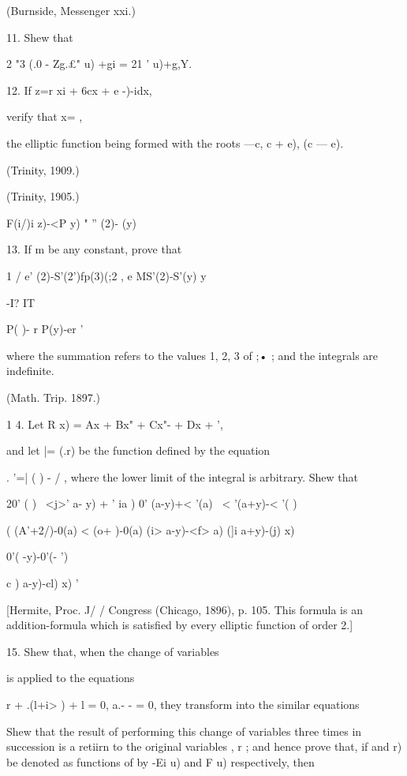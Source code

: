 {(Burnside, Messenger xxi.)

11. Shew that

2 "3 (.0 - Zg.£" u) +gi = 21 ' u)+g,Y.



12. If z=r xi + 6cx + e -)-idx,

verify that x= ,

the elliptic function being formed with the roots —c, c + e), (c — e).



(Trinity, 1909.)



(Trinity, 1905.)



F(i/)i z)-<P y) " '' (2)- (y)



13. If m be any constant, prove that



1 / e' (2)-S'(2')fp(3)(;2 , e MS'(2)-S'(y) y



-I? IT



 P( )- r P(y)-er '

where the summation refers to the values 1, 2, 3 of ;• ; and the
integrals are indefinite.

(Math. Trip. 1897.)

1 4. Let R x) = Ax + Bx" + Cx"- + Dx + ',

and let |= (.r) be the function defined by the equation

. '=| ( ) - / , where the lower limit of the integral is arbitrary.
Shew that

20' ( ) \ <j>' a- y) + ' ia ) 0' (a-y)+< '(a) \ < '(a+y)-< '( )

( (A'+2/)-0(a) < (o+ )-0(a) (i> a-y)-<f> a) (]i a+y)-(j) x)

0'( -y)-0'(- ')

c ) a-y)-cl) x) '

[Hermite, Proc. J/ / Congress (Chicago, 1896), p. 105. This formula is
an addition-formula which is satisfied by every elliptic function of
order 2.]

15. Shew that, when the change of variables

is applied to the equations

r + .(l+i> ) + l = 0, a.- - = 0, they transform into the similar
equations

Shew that the result of performing this change of variables three
times in succession is a retiirn to the original variables , r ; and
hence prove that, if and r) be denoted as functions of by -Ei u) and F
u) respectively, then

}
